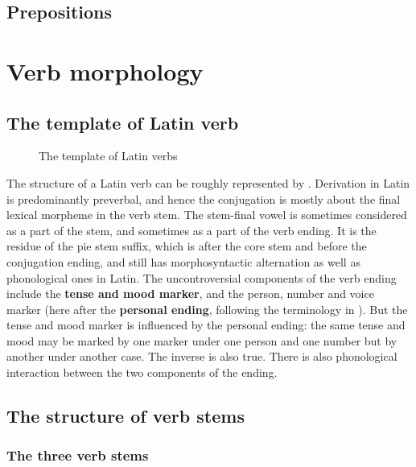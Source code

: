 \documentclass{article}
\newcommand*{\citesec}[1]{\S~{#1}}
\newcommand*{\concept}[1]{\textbf{#1}}
\begin{document}
\subsection{Prepositions}

\section{Verb morphology}

\subsection{The template of Latin verb}\label{sec:verb-template}

\begin{figure}
    \centering
    
    \caption{The template of Latin verbs}
    \label{fig:latin-verb}
\end{figure}

The structure of a Latin verb can be roughly represented by .
Derivation in Latin is predominantly preverbal,
and hence the conjugation is mostly about the final lexical morpheme in the verb stem.
The stem-final vowel is sometimes considered as a part of the stem,
and sometimes as a part of the verb ending.
It is the residue of the \ac{pie} stem suffix, which is after the core stem and before the conjugation ending,
and still has morphosyntactic alternation as well as phonological ones in Latin. %
The uncontroversial components of the verb ending include 
the \concept{tense and mood marker},
and the person, number and voice marker 
(here after the \concept{personal ending}, 
following the terminology in \citet[\citesec{165}]{allen1903allen}).
But the tense and mood marker is influenced by the personal ending:
the same tense and mood may be marked by one marker under one person and one number
but by another under another case.
The inverse is also true.
There is also phonological interaction between the two components of the ending.

\subsection{The structure of verb stems}

\subsubsection{The three verb stems}\label{sec:three-latin-stem}
\end{document}
